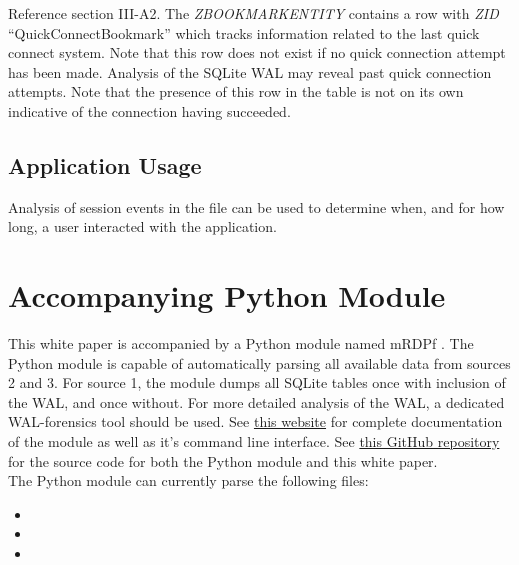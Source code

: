 \documentclass[journal]{IEEEtran}
\begin{document}
Reference section III-A2. The \textit{ZBOOKMARKENTITY} contains a row with \textit{ZID} ``QuickConnectBookmark'' which tracks information related to the last quick connect system. Note that this row does not exist if no quick connection attempt has been made. Analysis of the SQLite WAL may reveal past quick connection attempts. Note that the presence of this row in the table is not on its own indicative of the connection having succeeded.

\subsection{Application Usage}

Analysis of session events in the  file can be used to determine when, and for how long, a user interacted with the application.

\section{Accompanying Python Module}

This white paper is accompanied by a Python module named mRDPf \cite{noauthor_jholtmannmrdpf_nodate}. The Python module is capable of automatically  parsing all available data from sources 2 and 3. For source 1, the module dumps all SQLite tables once with inclusion of the WAL, and once without. For more detailed analysis of the WAL, a dedicated WAL-forensics tool should be used. See \href{https://jholtmann.github.io/mrdpf/}{this website} for complete documentation of the module as well as it's command line interface. See \href{https://github.com/jholtmann/mrdpf}{this GitHub repository} for the source code for both the Python module and this white paper.\\

The Python module can currently parse the following files:
\begin{itemize}
	\item {}
	\item {}
	\item {}
\end{itemize}
\end{document}
